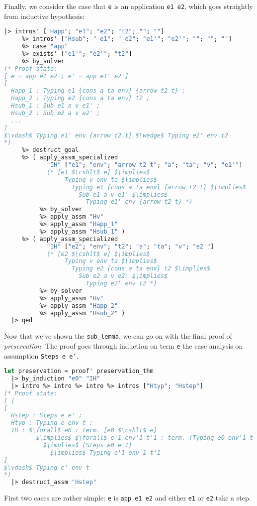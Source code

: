 \documentclass[english, mgr]{iithesis}
\renewcommand{\tt}[1]{\texttt{\small{#1}}}
\renewcommand{\it}[1]{\textit{#1}}
\begin{document}
Finally, we consider the case that \tt{e} is an application \tt{e1 e2},
which goes straightly from inductive hypothesis:
\begin{lstlisting}[mathescape, language=OCaml]
  |> intros' ["Happ"; "e1"; "e2"; "t2"; ""; ""]
     %> intros' ["Hsub"; "_e1"; "_e2"; "e1'"; "e2'"; ""; ""; ""]
     %> case "app"
     %> exists' ["e1'"; "e2'"; "t2"]
     %> by_solver
(* Proof state:
[ e = app e1 e2 ; e' = app e1' e2']
[
  Happ_1 : Typing e1 {cons a ta env} {arrow t2 t} ;
  Happ_2 : Typing e2 {cons a ta env} t2 ;
  Hsub_1 : Sub e1 a v e1' ;
  Hsub_2 : Sub e2 a v e2' ;
  ...
]
$\vdash$ Typing e1' env {arrow t2 t} $\wedge$ Typing e2' env t2
*)
     %> destruct_goal
     %> ( apply_assm_specialized
            "IH" ["e1"; "env"; "arrow t2 t"; "a"; "ta"; "v"; "e1'"]
            (* [e1 $\cshlt$ e] $\implies$
                 Typing v env ta $\implies$
                   Typing e1 {cons a ta env} {arrow t2 t} $\implies$
                     Sub e1 a v e1' $\implies$
                       Typing e1' env {arrow t2 t} *)
          %> by_solver
          %> apply_assm "Hv"
          %> apply_assm "Happ_1"
          %> apply_assm "Hsub_1" )
     %> ( apply_assm_specialized
            "IH" ["e2"; "env"; "t2"; "a"; "ta"; "v"; "e2'"]
            (* [e2 $\cshlt$ e] $\implies$
                 Typing v env ta $\implies$
                   Typing e2 {cons a ta env} t2 $\implies$
                     Sub e2 a v e2' $\implies$
                       Typing e2' env t2 *)
          %> by_solver
          %> apply_assm "Hv"
          %> apply_assm "Happ_2"
          %> apply_assm "Hsub_2" )
  |> qed
\end{lstlisting}
Now that we've shown the \tt{sub\_lemma}, we can go on with the final proof
of \it{preservation}.
The proof goes through induction on term \tt{e} the case analysis on assumption \tt{Steps e e'}.
\begin{lstlisting}[mathescape, language=OCaml]
let preservation = proof' preservation_thm
  |> by_induction "e0" "IH"
  |> intro %> intro %> intro %> intros ["Htyp"; "Hstep"]
(* Proof state:
[ ]
[
  Hstep : Steps e e' ;
  Htyp : Typing e env t ;
  IH : $\forall$ e0 : term. [e0 $\cshlt$ e]
         $\implies$ $\forall$ e'1 env'1 t'1 : term. (Typing e0 env'1 t'1)
           $\implies$ (Steps e0 e'1)
             $\implies$ Typing e'1 env'1 t'1
]
$\vdash$ Typing e' env t
*)
  |> destruct_assm "Hstep"
\end{lstlisting}
First two cases are rather simple: \tt{e} is \tt{app e1 e2} and either \tt{e1} or \tt{e2} take a step.
\end{document}
